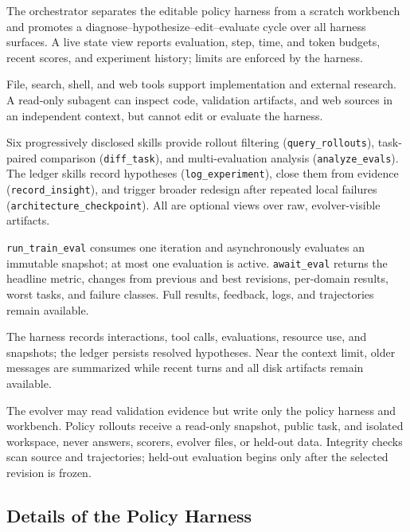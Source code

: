 The orchestrator separates the editable policy harness from a scratch
workbench and promotes a diagnose--hypothesize--edit--evaluate cycle over all
harness surfaces.  A live state view reports evaluation, step, time, and token
budgets, recent scores, and experiment history; limits are enforced by the
harness.

File, search, shell, and web tools support implementation and external research.
A read-only subagent can inspect code, validation artifacts, and web sources in
an independent context, but cannot edit or evaluate the harness.

Six progressively disclosed skills provide rollout filtering
(\texttt{query\_rollouts}), task-paired comparison (\texttt{diff\_task}), and
multi-evaluation analysis (\texttt{analyze\_evals}).  The ledger skills record
hypotheses (\texttt{log\_experiment}), close them from evidence
(\texttt{record\_insight}), and trigger broader redesign after repeated local
failures (\texttt{architecture\_checkpoint}).  All are optional views over raw,
evolver-visible artifacts.

\texttt{run\_train\_eval} consumes one iteration and asynchronously evaluates an
immutable snapshot; at most one evaluation is active.  \texttt{await\_eval}
returns the headline metric, changes from previous and best revisions,
per-domain results, worst tasks, and failure classes.  Full results, feedback,
logs, and trajectories remain available.

The harness records interactions, tool calls, evaluations, resource use, and
snapshots; the ledger persists resolved hypotheses.  Near the context limit,
older messages are summarized while recent turns and all disk artifacts remain
available.

The evolver may read validation evidence but write only the policy harness and
workbench.  Policy rollouts receive a read-only snapshot, public task, and
isolated workspace, never answers, scorers, evolver files, or held-out data.
Integrity checks scan source and trajectories; held-out evaluation begins only
after the selected revision is frozen.

\subsection{Details of the Policy Harness}
\label{app:policy-harness}

